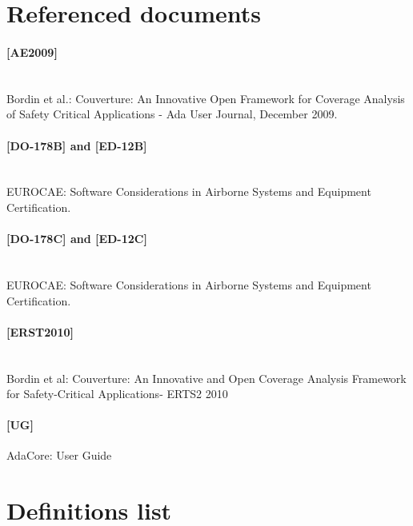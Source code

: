 \newcommand{\erts}{[ERST2010]\space}
\newcommand{\adaeurope}{[AE2009]\space}
\newcommand{\castseventeen}{[CAST17]\space}

\section{Referenced documents}
\paragraph*{\adaeurope} \ \\
Bordin et al.: Couverture: An Innovative Open Framework for Coverage Analysis of Safety Critical Applications - Ada User Journal, December 2009.
\paragraph*{[DO-178B] and [ED-12B]} \ \\
EUROCAE: Software Considerations in Airborne Systems and Equipment Certification.
\paragraph*{[DO-178C] and [ED-12C]} \ \\
EUROCAE: Software Considerations in Airborne Systems and Equipment Certification.
\paragraph*{\erts} \ \\
Bordin et al: Couverture: An Innovative and Open Coverage Analysis Framework for Safety-Critical Applications- ERTS2 2010
\paragraph*{[\xcov UG]}
AdaCore: \xcov User Guide

\section{Definitions list}

\paragraph*{\xcov} \ \\


